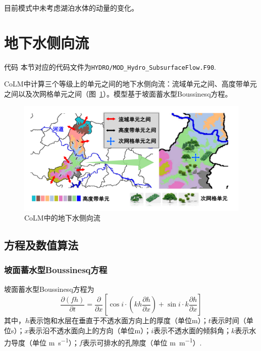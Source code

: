 目前模式中未考虑湖泊水体的动量的变化。

\section{地下水侧向流}

\begin{mymdframed}{代码}
  本节对应的代码文件为\texttt{HYDRO/MOD\_Hydro\_SubsurfaceFlow.F90}.
\end{mymdframed}

CoLM中计算三个等级上的单元之间的地下水侧向流：流域单元之间、高度带单元之间以及次网格单元之间（图~\ref{fig:地下水侧向流}）。模型基于坡面蓄水型Boussinesq方程。

{
  \begin{figure}[htbp]
    \centering
    \includegraphics[width=\textwidth]{Figures/侧向流/地下水侧向流.pdf}
    \caption{CoLM中的地下水侧向流}
    \label{fig:地下水侧向流}
  \end{figure}
}

\subsection{方程及数值算法}
\subsubsection{坡面蓄水型Boussinesq方程}
坡面蓄水型Boussinesq方程为
\begin{equation}
  \frac{\partial \left(fh\right)}{\partial t} = \frac{\partial}{\partial x} \left[\cos i \cdot \left(kh\frac{\partial h}{\partial x}\right)+\sin i\cdot k\frac{\partial h}{\partial x}\right]
\end{equation}
其中，$h$表示饱和水层在垂直于不透水面方向上的厚度（单位m）；$t$表示时间（单位s）；$x$表示沿不透水面向上的方向（单位m）；$i$表示不透水面的倾斜角；$k$表示水力导度（单位 \unit{m.s^{-1}}）；$f$表示可排水的孔隙度（单位 \unit{m.m^{-1}}）.

